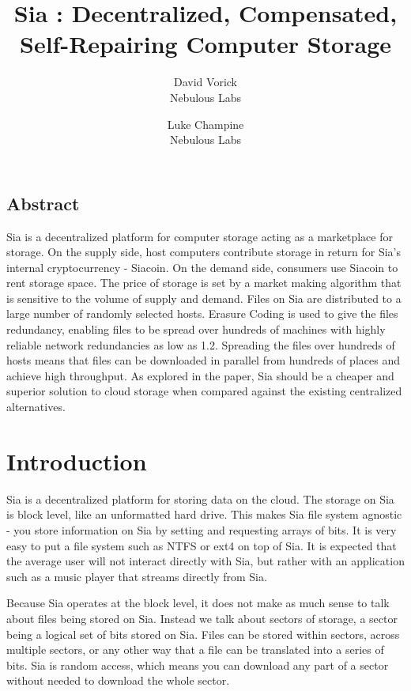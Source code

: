 \documentclass[twocolumn]{article}
\begin{document}
\frenchspacing

\title{Sia : Decentralized, Compensated, Self-Repairing Computer Storage}

\author{
{\rm David Vorick}\\
Nebulous Labs
\and
{\rm Luke Champine}\\
Nebulous Labs
}

\maketitle

\subsection*{Abstract}
Sia is a decentralized platform for computer storage acting as a marketplace for storage.
On the supply side, host computers contribute storage in return for Sia's internal cryptocurrency - Siacoin.
On the demand side, consumers use Siacoin to rent storage space.
The price of storage is set by a market making algorithm that is sensitive to the volume of supply and demand.
Files on Sia are distributed to a large number of randomly selected hosts.
Erasure Coding is used to give the files redundancy, enabling files to be spread over hundreds of machines with highly reliable network redundancies as low as 1.2.
Spreading the files over hundreds of hosts means that files can be downloaded in parallel from hundreds of places and achieve high throughput.
As explored in the paper, Sia should be a cheaper and superior solution to cloud storage when compared against the existing centralized alternatives.

\section{Introduction}

Sia is a decentralized platform for storing data on the cloud.
The storage on Sia is block level, like an unformatted hard drive.
This makes Sia file system agnostic - you store information on Sia by setting and requesting arrays of bits.
It is very easy to put a file system such as NTFS or ext4 on top of Sia.
It is expected that the average user will not interact directly with Sia, but rather with an application such as a music player that streams directly from Sia.

Because Sia operates at the block level, it does not make as much sense to talk about files being stored on Sia.
Instead we talk about sectors of storage, a sector being a logical set of bits stored on Sia.
Files can be stored within sectors, across multiple sectors, or any other way that a file can be translated into a series of bits.
Sia is random access, which means you can download any part of a sector without needed to download the whole sector.
\end{document}
